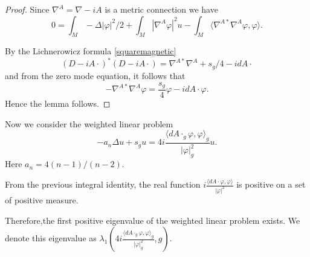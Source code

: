 \documentclass[11pt]{amsart}
\theoremstyle{plain}
\numberwithin{equation}{section}
\theoremstyle{plain}
\begin{document}
\begin{proof}
Since $\nabla^A=\nabla -iA$ is a metric connection we have $$0=\int_M-\Delta|\varphi|^2/2+\int_M|\nabla^A\varphi|^2u-\int_M\langle\nabla^{A*}\nabla^A\varphi,\varphi\rangle.$$

By the Lichnerowicz formula \eqref{squaremagnetic} $$(D-iA\cdot)^*(D-iA\cdot)=\nabla^{A*}\nabla^A+s_g/4-idA\cdot$$
and from the zero mode equation, it follows that $$-\nabla^{A*}\nabla^A\varphi=\frac{s_g}{4}\varphi-idA\cdot\varphi.$$
Hence the lemma follows.
\end{proof}

Now we consider the weighted linear  problem $$-a_n\Delta u+s_gu=4i\frac{\langle dA\cdot_g\varphi,\varphi\rangle_g}{|\varphi|_g^2}u.$$ 
Here $a_n=4(n-1)/(n-2)$.

From the previous integral identity, the real function $i\frac{\langle dA\cdot\varphi,\varphi\rangle}{|\varphi|^2}$  is positive on a set of positive measure. 
 
Therefore,the first positive eigenvalue of the weighted linear problem exists. We denote this eigenvalue as $\lambda_1\left(4i\frac{\langle dA\cdot_g\varphi,\varphi\rangle_g}{|\varphi|_g^2},g\right)$.
\end{document}
